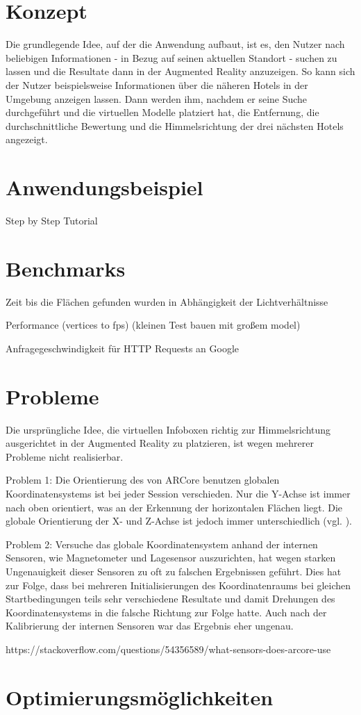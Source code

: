 \section{Konzept}

Die grundlegende Idee, auf der die Anwendung aufbaut, ist es, den Nutzer nach beliebigen Informationen - in Bezug auf seinen aktuellen Standort - suchen zu lassen und die Resultate dann in der Augmented Reality anzuzeigen. So kann sich der Nutzer beispielsweise Informationen über die näheren Hotels in der Umgebung anzeigen lassen. Dann werden ihm, nachdem er seine Suche durchgeführt und die virtuellen Modelle platziert hat, die Entfernung, die durchschnittliche Bewertung und die Himmelsrichtung der drei nächsten Hotels angezeigt.

\section{Anwendungsbeispiel}

Step by Step Tutorial

\section{Benchmarks}

Zeit bis die Flächen gefunden wurden in Abhängigkeit der Lichtverhältnisse

Performance (vertices to fps) (kleinen Test bauen mit großem model)

Anfragegeschwindigkeit für HTTP Requests an Google

\section{Probleme}

Die ursprüngliche Idee, die virtuellen Infoboxen richtig zur Himmelsrichtung ausgerichtet in der Augmented Reality zu platzieren, ist wegen mehrerer Probleme nicht realisierbar.

Problem 1: Die Orientierung des von ARCore benutzen globalen Koordinatensystems ist bei jeder Session verschieden. Nur die Y-Achse ist immer nach oben orientiert, was an der Erkennung der horizontalen Flächen liegt. Die globale Orientierung der X- und Z-Achse ist jedoch immer unterschiedlich (vgl. \cite{arcore_geo}).

Problem 2: Versuche das globale Koordinatensystem anhand der internen Sensoren, wie Magnetometer und Lagesensor auszurichten, hat wegen starken Ungenauigkeit dieser Sensoren zu oft zu falschen Ergebnissen geführt. Dies hat zur Folge, dass bei mehreren Initialisierungen des Koordinatenraums bei gleichen Startbedingungen teils sehr verschiedene Resultate und damit Drehungen des Koordinatensystems in die falsche Richtung zur Folge hatte. Auch nach der Kalibrierung der internen Sensoren war das Ergebnis eher ungenau. 


https://stackoverflow.com/questions/54356589/what-sensors-does-arcore-use

\section{Optimierungsmöglichkeiten}






